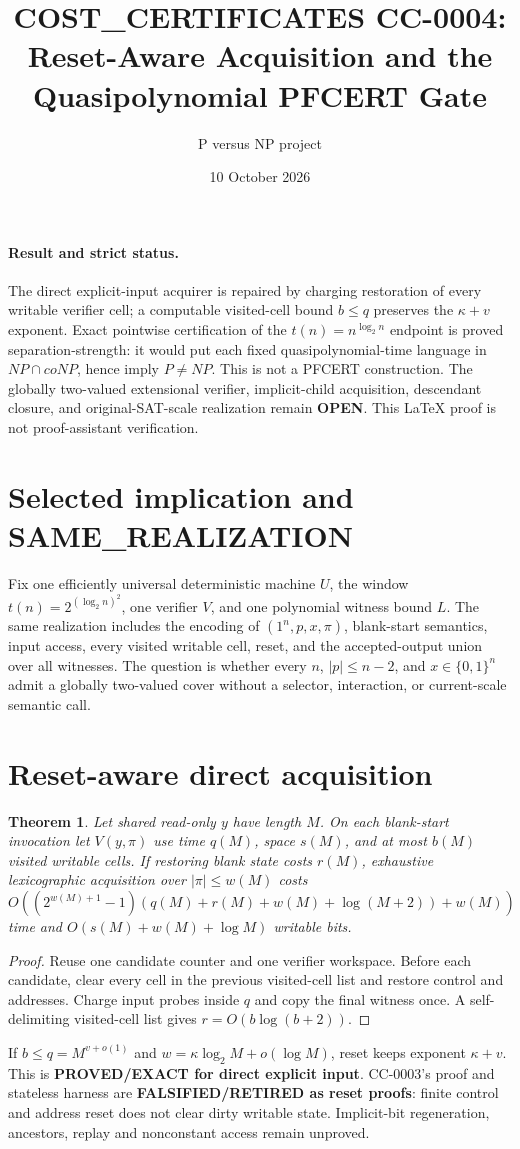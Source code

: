 \documentclass[11pt]{article}
\title{COST\_CERTIFICATES CC-0004:\\Reset-Aware Acquisition and the Quasipolynomial PFCERT Gate}
\author{P versus NP project}
\date{10 October 2026}
\newtheorem{theorem}{Theorem}
\begin{document}
\maketitle

\paragraph{Result and strict status.}
The direct explicit-input acquirer is repaired by charging restoration of
every writable verifier cell; a computable visited-cell bound \(b\le q\)
preserves the \(\kappa+v\) exponent.  Exact pointwise certification of the
\(t(n)=n^{\log_2 n}\) endpoint is proved separation-strength: it would put
each fixed quasipolynomial-time language in \(NP\cap coNP\), hence imply
\(P\ne NP\).  This is not a PFCERT construction.  The globally two-valued
extensional verifier, implicit-child acquisition, descendant closure, and
original-SAT-scale realization remain \textbf{OPEN}.  This LaTeX proof is
not proof-assistant verification.

\section{Selected implication and SAME\_REALIZATION}
Fix one efficiently universal deterministic machine \(U\), the window
\(t(n)=2^{(\log_2 n)^2}\), one verifier \(V\), and one polynomial witness
bound \(L\).  The same realization includes the encoding of
\((1^n,p,x,\pi)\), blank-start semantics, input access, every visited
writable cell, reset, and the accepted-output union over all witnesses.  The
question is whether every \(n\), \(|p|\le n-2\), and \(x\in\{0,1\}^n\) admit
a globally two-valued cover without a selector, interaction, or current-scale
semantic call.

\section{Reset-aware direct acquisition}
\begin{theorem}
Let shared read-only \(y\) have length \(M\).  On each blank-start invocation
let \(V(y,\pi)\) use time \(q(M)\), space \(s(M)\), and at most \(b(M)\)
visited writable cells.  If restoring blank state costs \(r(M)\), exhaustive
lexicographic acquisition over \(|\pi|\le w(M)\) costs
\[
 O((2^{w(M)+1}-1)(q(M)+r(M)+w(M)+\log(M+2))+w(M))
\]
time and \(O(s(M)+w(M)+\log M)\) writable bits.
\end{theorem}
\begin{proof}
Reuse one candidate counter and one verifier workspace.  Before each
candidate, clear every cell in the previous visited-cell list and restore
control and addresses.  Charge input probes inside \(q\) and copy the final
witness once.  A self-delimiting visited-cell list gives
\(r=O(b\log(b+2))\).
\end{proof}
If \(b\le q=M^{v+o(1)}\) and
\(w=\kappa\log_2M+o(\log M)\), reset keeps exponent \(\kappa+v\).
This is \textbf{PROVED/EXACT for direct explicit input}.  CC-0003's proof
and stateless harness are \textbf{FALSIFIED/RETIRED as reset proofs}: finite
control and address reset does not clear dirty writable state.  Implicit-bit
regeneration, ancestors, replay and nonconstant access remain unproved.
\end{document}
